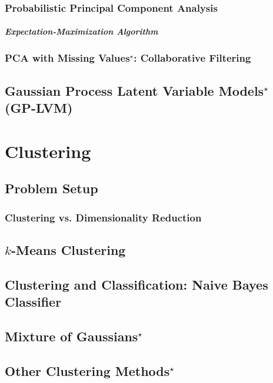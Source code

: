 \documentclass{report}
\newcommand{\todo}[1]{{\Large\textcolor{red}{#1}}}
\begin{document}
\todo{}

\subsection{Probabilistic Principal Component Analysis}

\paragraph{Expectation-Maximization Algorithm}

\subsection{PCA with Missing Values$^\star$: Collaborative Filtering}

\section{Gaussian Process Latent Variable Models$^\star$ (GP-LVM)}


\chapter{Clustering}
\label{sec:cluster}

\section{Problem Setup}

\subsection{Clustering vs. Dimensionality Reduction}

\section{$k$-Means Clustering}

\section{Clustering and Classification: Naive Bayes Classifier}

\section{Mixture of Gaussians$^\star$}

\section{Other Clustering Methods$^\star$}
\end{document}
